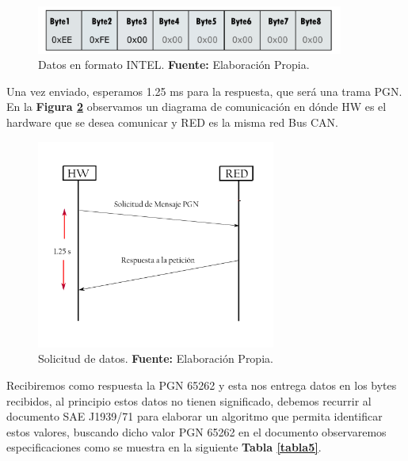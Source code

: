     \begin{figure}[H]
		\centering
		\includegraphics[width=0.9\textwidth]{./Cap3imagen/datosJ1939.pdf}
		\caption[Datos en formato INTEL.]{Datos en formato INTEL.\textbf{ Fuente:} %
		Elaboración Propia.}
		\label{fig_datosj1939_c3} %
	\end{figure}


Una vez enviado, esperamos 1.25 ms para la respuesta, que será una trama PGN. En la \textbf{Figura \ref{fig_peticionj1939_c3}} observamos un diagrama de comunicación en dónde HW es el hardware que se desea comunicar y RED es la misma red Bus CAN.

        \begin{figure}[H]
		\centering
		\includegraphics[width=0.7\textwidth]{./Cap3imagen/peticionj1939.pdf}
		\caption[Solicitud de datos.]{Solicitud de datos.\textbf{ Fuente:} %
		Elaboración Propia.}
		\label{fig_peticionj1939_c3} %
    	\end{figure}



Recibiremos como respuesta la PGN 65262 y esta nos entrega datos en los bytes recibidos, al principio estos datos no tienen significado, debemos recurrir al documento SAE J1939/71 para elaborar un algoritmo que permita identificar estos valores, buscando dicho valor PGN 65262 en el documento observaremos especificaciones como se muestra en la siguiente \textbf{Tabla \ref{tabla5}}.

